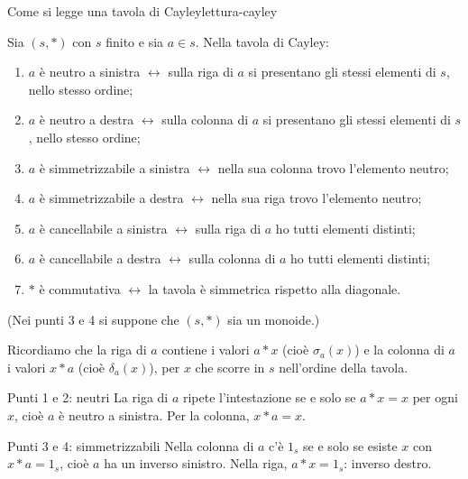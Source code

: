 \begin{concetto}
\begin{Proposizione}{Come si legge una tavola di Cayley}{lettura-cayley}
    \begin{prerequisiti}
    \end{prerequisiti}
    Sia $(s, *)$ con $s$ finito e sia $a \in s$. Nella tavola di Cayley:
    \begin{enumerate}
        \item $a$ è neutro a sinistra $\leftrightarrow$ sulla riga di $a$ si presentano gli stessi elementi di $s$, nello stesso ordine;
        \item $a$ è neutro a destra $\leftrightarrow$ sulla colonna di $a$ si presentano gli stessi elementi di $s$, nello stesso ordine;
        \item $a$ è simmetrizzabile a sinistra $\leftrightarrow$ nella sua colonna trovo l'elemento neutro;
        \item $a$ è simmetrizzabile a destra $\leftrightarrow$ nella sua riga trovo l'elemento neutro;
        \item $a$ è cancellabile a sinistra $\leftrightarrow$ sulla riga di $a$ ho tutti elementi distinti;
        \item $a$ è cancellabile a destra $\leftrightarrow$ sulla colonna di $a$ ho tutti elementi distinti;
        \item $*$ è commutativa $\leftrightarrow$ la tavola è simmetrica rispetto alla diagonale.
    \end{enumerate}
    (Nei punti 3 e 4 si suppone che $(s, *)$ sia un monoide.)
\end{Proposizione}
\begin{dimostrazione}
    Ricordiamo che la riga di $a$ contiene i valori $a * x$ (cioè $\sigma_a(x)$) e la colonna di $a$ i valori $x * a$ (cioè $\delta_a(x)$), per $x$ che scorre in $s$
    nell'ordine della tavola.
    \begin{caso}{Punti 1 e 2: neutri}
        La riga di $a$ ripete l'intestazione se e solo se $a * x = x$ per ogni $x$, cioè $a$ è neutro a sinistra. Per la colonna, $x * a = x$.
    \end{caso}
    \begin{caso}{Punti 3 e 4: simmetrizzabili}
        Nella colonna di $a$ c'è $1_s$ se e solo se esiste $x$ con $x * a = 1_s$, cioè $a$ ha un inverso sinistro. Nella riga, $a * x = 1_s$: inverso destro.

\end{caso}
\end{dimostrazione}
\end{concetto}

